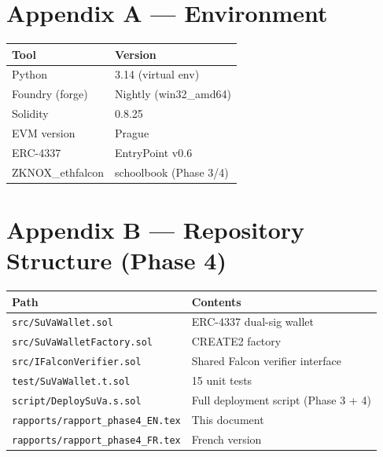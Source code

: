 \documentclass[11pt,a4paper]{article}
\begin{document}
\appendix
\section{Appendix A --- Environment}

\begin{center}
\begin{tabular}{ll}
\toprule
\textbf{Tool} & \textbf{Version} \\
\midrule
Python          & 3.14 (virtual env) \\
Foundry (forge) & Nightly (win32\_amd64) \\
Solidity        & 0.8.25 \\
EVM version     & Prague \\
ERC-4337        & EntryPoint v0.6 \\
ZKNOX\_ethfalcon & schoolbook (Phase 3/4) \\
\bottomrule
\end{tabular}
\end{center}

\section{Appendix B --- Repository Structure (Phase 4)}

\begin{center}
\begin{tabular}{ll}
\toprule
\textbf{Path} & \textbf{Contents} \\
\midrule
\texttt{src/SuVaWallet.sol}        & ERC-4337 dual-sig wallet \\
\texttt{src/SuVaWalletFactory.sol} & CREATE2 factory \\
\texttt{src/IFalconVerifier.sol}   & Shared Falcon verifier interface \\
\texttt{test/SuVaWallet.t.sol}     & 15 unit tests \\
\texttt{script/DeploySuVa.s.sol}   & Full deployment script (Phase 3 + 4) \\
\texttt{rapports/rapport\_phase4\_EN.tex} & This document \\
\texttt{rapports/rapport\_phase4\_FR.tex} & French version \\
\bottomrule
\end{tabular}
\end{center}

\end{document}

